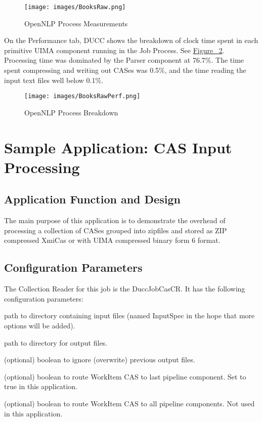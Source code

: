 \begin{figure}[H]
  \centering
  \texttt{[image: images/BooksRaw.png]}
  \caption{OpenNLP Process Measurements}
  \label{fig:OpenNLP-Process-Measurements}
\end{figure}

On the Performance tab, DUCC shows the breakdown of clock time spent in each primitive UIMA component running in the 
Job Process. See \hyperref[fig:OpenNLP-Process-Breakdown]{Figure ~\ref{fig:OpenNLP-Process-Breakdown}}.
Processing time was dominated by the Parser component at 76.7\%. The time spent compressing and writing out CASes 
was 0.5\%, and the time reading the input text files well below 0.1\%.

\begin{figure}[H]
  \centering
  \texttt{[image: images/BooksRawPerf.png]}
  \caption{OpenNLP Process Breakdown}
  \label{fig:OpenNLP-Process-Breakdown}
\end{figure}


\chapter{Sample Application: CAS Input Processing}

\section{Application Function and Design}
The main purpose of this application is to demonstrate the overhead of processing a collection of CASes grouped into 
zipfiles and stored as ZIP compressed XmiCas or with UIMA compressed binary form 6 format.


\section{Configuration Parameters}
The Collection Reader for this job is the DuccJobCasCR. It has the following configuration
parameters:

\begin{description}[labelindent=0.5in,leftmargin=0.5in]
    \item[InputSpec] path to directory containing input files (named InputSpec in the hope that more options will be added).
    \item[OutputDirectory] path to directory for output files.
    \item[IgnorePreviousOutput] (optional) boolean to ignore (overwrite) previous output files.
    \item[SendToLast] (optional) boolean to route WorkItem CAS to last pipeline component. Set to true in this application.
    \item[SendToAll] (optional) boolean to route WorkItem CAS to all pipeline components. Not used in this application.
\end{description}



